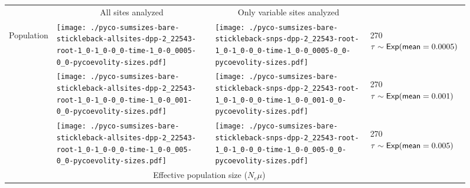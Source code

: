 \documentclass[border=10pt,varwidth=30cm]{standalone}
\begin{document}
\begin{figure}
    \centering
    \begin{tabular}{@{}llll@{}}
        & \multicolumn{1}{c}{\large All sites analyzed} & \multicolumn{1}{c}{\large Only variable sites analyzed} & \\[1ex]
        \multirow{2}{*}[-4em]{\begin{sideways}\large Population\end{sideways}}
        & \texttt{[image: ./pyco-sumsizes-bare-stickleback-allsites-dpp-2\_22543-root-1\_0-1\_0-0\_0-time-1\_0-0\_0005-0\_0-pycoevolity-sizes.pdf]}
        & \texttt{[image: ./pyco-sumsizes-bare-stickleback-snps-dpp-2\_22543-root-1\_0-1\_0-0\_0-time-1\_0-0\_0005-0\_0-pycoevolity-sizes.pdf]}
        & \multirow{1}{*}[11.5em]{\begin{rotate}{270}$\tau \sim \textrm{\sffamily Exp}(\textrm{\sffamily mean}=0.0005)$\end{rotate}} \\
        & \texttt{[image: ./pyco-sumsizes-bare-stickleback-allsites-dpp-2\_22543-root-1\_0-1\_0-0\_0-time-1\_0-0\_001-0\_0-pycoevolity-sizes.pdf]}
        & \texttt{[image: ./pyco-sumsizes-bare-stickleback-snps-dpp-2\_22543-root-1\_0-1\_0-0\_0-time-1\_0-0\_001-0\_0-pycoevolity-sizes.pdf]}
        & \multirow{1}{*}[11em]{\begin{rotate}{270}$\tau \sim \textrm{\sffamily Exp}(\textrm{\sffamily mean}=0.001)$\end{rotate}} \\
        & \texttt{[image: ./pyco-sumsizes-bare-stickleback-allsites-dpp-2\_22543-root-1\_0-1\_0-0\_0-time-1\_0-0\_005-0\_0-pycoevolity-sizes.pdf]}
        & \texttt{[image: ./pyco-sumsizes-bare-stickleback-snps-dpp-2\_22543-root-1\_0-1\_0-0\_0-time-1\_0-0\_005-0\_0-pycoevolity-sizes.pdf]}
        & \multirow{1}{*}[11em]{\begin{rotate}{270}$\tau \sim \textrm{\sffamily Exp}(\textrm{\sffamily mean}=0.005)$\end{rotate}} \\
        & \multicolumn{2}{c}{\large Effective population size ($N_e\mu$)} & 
    \end{tabular}
\end{figure}
\end{document}
